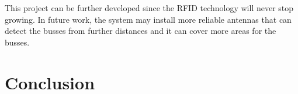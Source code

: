 \documentclass[a4paper,twoside]{IEEEtran}
\begin{document}
This project can be further developed since the RFID technology will never stop growing. In future work, the system may install more reliable antennas that can detect the busses from further distances and it can cover more areas for the busses.

\section{Conclusion}







\end{document}
